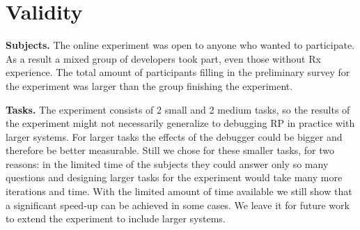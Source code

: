 \section{Validity}
\textbf{Subjects.} The online experiment was open to anyone who wanted to participate. As a result a mixed group of developers took part, even those without Rx experience. The total amount of participants filling in the preliminary survey for the experiment was larger than the group finishing the experiment.


\textbf{Tasks.} The experiment consists of 2 small and 2 medium tasks, so the results of the experiment might not necessarily generalize to debugging RP in practice with larger systems. For larger tasks the effects of the debugger could be bigger and therefore be better measurable. Still we chose for these smaller tasks, for two reasons: in the limited time of the subjects they could answer only so many questions and designing larger tasks for the experiment would take many more iterations and time. With the limited amount of time available we still show that a significant speed-up can be achieved in some cases. We leave it for future work to extend the experiment to include larger systems.
